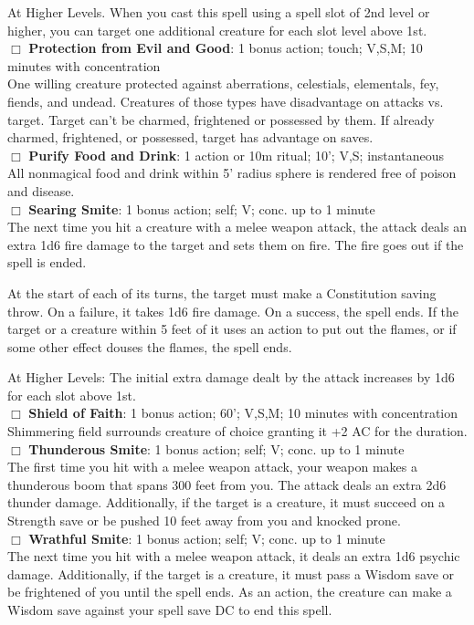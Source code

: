 \documentclass[11pt]{article}
\newcommand{\spell}[1]{{\sc\bfseries #1}}
\begin{document}
{At Higher Levels. When you cast this spell using a spell slot of 2nd
level or higher, you can target one additional creature for each slot
level above 1st.
\\[4pt]
$\Box$ \spell{Protection from Evil and Good}: 1 bonus action; touch; V,S,M; 10 minutes with concentration
\\
One willing creature protected against aberrations, celestials, elementals, fey, fiends, and undead.  Creatures of those types have disadvantage on attacks vs. target. Target can't be charmed, frightened or possessed by them.  If already charmed, frightened, or possessed, target has advantage on saves.
\\[4pt]
$\Box$ \spell{Purify Food and Drink}: 1 action or 10m ritual; 10'; V,S; instantaneous
\\
All nonmagical food and drink within 5' radius sphere is rendered free of poison and disease.
\\[4pt]
$\Box$ \spell{Searing Smite}: 1 bonus action; self; V; conc. up to 1
minute
\\
The next time you hit a creature with a melee weapon attack, the
attack deals an extra 1d6 fire damage to the target and sets them on
fire. The fire goes out if the spell is ended.

At the start of each of its turns, the target must make a Constitution
saving throw. On a failure, it takes 1d6 fire damage. On a success,
the spell ends. If the target or a creature within 5 feet of it uses
an action to put out the flames, or if some other effect douses the
flames, the spell ends.

At Higher Levels: The initial extra damage dealt by the attack
increases by 1d6 for each slot above 1st.
\\[4pt]
$\Box$ \spell{Shield of Faith}: 1 bonus action; 60'; V,S,M; 10 minutes
with concentration
\\
Shimmering field surrounds creature of choice granting it +2 AC for
the duration.
\\[4pt]
$\Box$ \spell{Thunderous Smite}: 1 bonus action; self; V; conc. up to
1 minute
\\
The first time you hit with a melee weapon attack, your weapon makes a
thunderous boom that spans 300 feet from you. The attack deals an
extra 2d6 thunder damage. Additionally, if the target is a creature,
it must succeed on a Strength save or be pushed 10 feet away from you
and knocked prone.
\\[4pt]
$\Box$ \spell{Wrathful Smite}: 1 bonus action; self; V; conc. up to 1
minute
\\
The next time you hit with a melee weapon attack, it deals an extra 1d6 psychic damage. Additionally, if the target is a creature, it must pass a Wisdom save or be frightened of you until the spell ends. As an action, the creature can make a Wisdom save against your spell save DC to end this spell.
\\[12pt]


}
\end{document}
